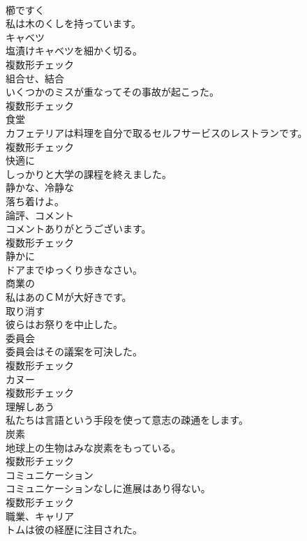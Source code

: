 \documentclass[8pt]{extreport}
\begin{document}
\begin{CJK}{UTF8}{min}
\\	[動詞]	櫛ですく	
\\	私は木のくしを持っています。	
\\	[名詞]	キャベツ	
\\	塩漬けキャベツを細かく切る。	
\\	複数形チェック
\\	[名詞]	組合せ、結合	
\\	いくつかのミスが重なってその事故が起こった。	
\\	複数形チェック
\\	[名詞]	食堂	
\\	カフェテリアは料理を自分で取るセルフサービスのレストランです。	
\\	複数形チェック
\\	[副詞]	快適に	
\\	しっかりと大学の課程を終えました。	
\\	[形容詞]	静かな、冷静な	
\\	落ち着けよ。	
\\	[名詞]	論評、コメント	
\\	コメントありがとうございます。	
\\	複数形チェック
\\	[副詞]	静かに	
\\	ドアまでゆっくり歩きなさい。	
\\	[形容詞]	商業の	
\\	私はあのＣＭが大好きです。	
\\	[動詞]	取り消す	
\\	彼らはお祭りを中止した。	
\\	[名詞]	委員会	
\\	委員会はその議案を可決した。	
\\	複数形チェック
\\	[名詞]	カヌー	
\\	複数形チェック
\\	[動詞]	理解しあう	
\\	私たちは言語という手段を使って意志の疎通をします。	
\\	[名詞]	炭素	
\\	地球上の生物はみな炭素をもっている。	
\\	複数形チェック
\\	[名詞]	コミュニケーション	
\\	コミュニケーションなしに進展はあり得ない。	
\\	複数形チェック
\\	[名詞]	職業、キャリア	
\\	トムは彼の経歴に注目された。	

\end{CJK}
\end{document}
